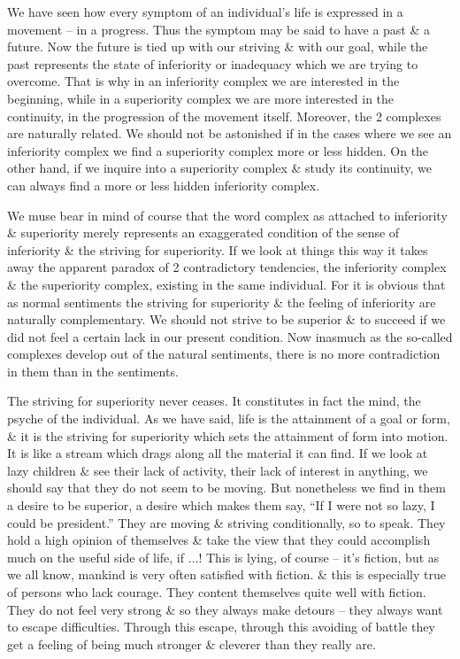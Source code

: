 \documentclass{article}
\begin{document}
We have seen how every symptom of an individual's life is expressed in a movement -- in a progress. Thus the symptom may be said to have a past \& a future. Now the future is tied up with our striving \& with our goal, while the past represents the state of inferiority or inadequacy which we are trying to overcome. That is why in an inferiority complex we are interested in the beginning, while in a superiority complex we are more interested in the continuity, in the progression of the movement itself. Moreover, the 2 complexes are naturally related. We should not be astonished if in the cases where we see an inferiority complex we find a superiority complex more or less hidden. On the other hand, if we inquire into a superiority complex \& study its continuity, we can always find a more or less hidden inferiority complex.

We muse bear in mind of course that the word complex as attached to inferiority \& superiority merely represents an exaggerated condition of the sense of inferiority \& the striving for superiority. If we look at things this way it takes away the apparent paradox of 2 contradictory tendencies, the inferiority complex \& the superiority complex, existing in the same individual. For it is obvious that as normal sentiments the striving for superiority \& the feeling of inferiority are naturally complementary. We should not strive to be superior \& to succeed if we did not feel a certain lack in our present condition. Now inasmuch as the so-called complexes develop out of the natural sentiments, there is no more contradiction in them than in the sentiments.

The striving for superiority never ceases. It constitutes in fact the mind, the psyche of the individual. As we have said, life is the attainment of a goal or form, \& it is the striving for superiority which sets the attainment of form into motion. It is like a stream which drags along all the material it can find. If we look at lazy children \& see their lack of activity, their lack of interest in anything, we should say that they do not seem to be moving. But nonetheless we find in them a desire to be superior, a desire which makes them say, ``If I were not so lazy, I could be president.'' They are moving \& striving conditionally, so to speak. They hold a high opinion of themselves \& take the view that they could accomplish much on the useful side of life, if $\ldots$! This is lying, of course -- it's fiction, but as we all know, mankind is very often satisfied with fiction. \& this is especially true of persons who lack courage. They content themselves quite well with fiction. They do not feel very strong \& so they always make detours -- they always want to escape difficulties. Through this escape, through this avoiding of battle they get a feeling of being much stronger \& cleverer than they really are.
\end{document}
